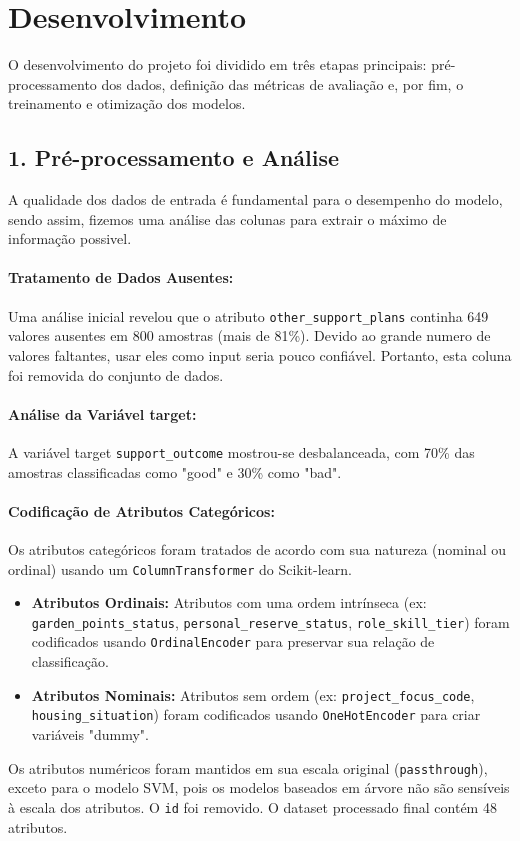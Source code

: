 \section*{Desenvolvimento}

O desenvolvimento do projeto foi dividido em três etapas principais: pré-processamento dos dados, definição das métricas de avaliação e, por fim, o treinamento e otimização dos modelos.

\subsection*{1. Pré-processamento e Análise}
A qualidade dos dados de entrada é fundamental para o desempenho do modelo, sendo assim, fizemos uma análise das colunas para extrair o máximo de informação possivel.

\paragraph{Tratamento de Dados Ausentes:} Uma análise inicial revelou que o atributo \texttt{other\_support\_plans} continha 649 valores ausentes em 800 amostras (mais de 81\%).
Devido ao grande numero de valores faltantes, usar eles como input seria pouco confiável.
Portanto, esta coluna foi removida do conjunto de dados.

\paragraph{Análise da Variável target:} A variável target \texttt{support\_outcome} mostrou-se desbalanceada, com 70\% das amostras classificadas como "good" e 30\% como "bad".

\paragraph{Codificação de Atributos Categóricos:} Os atributos categóricos foram tratados de acordo 
com sua natureza (nominal ou ordinal) usando um \texttt{ColumnTransformer} do Scikit-learn.
\begin{itemize}
    \item \textbf{Atributos Ordinais:} Atributos com uma ordem intrínseca (ex: \texttt{garden\_points\_status}, \texttt{personal\_reserve\_status}, \texttt{role\_skill\_tier}) foram codificados usando \texttt{OrdinalEncoder} para preservar sua relação de classificação.
    \item \textbf{Atributos Nominais:} Atributos sem ordem (ex: \texttt{project\_focus\_code}, \texttt{housing\_situation}) foram codificados usando \texttt{OneHotEncoder} para criar variáveis "dummy".
\end{itemize}
Os atributos numéricos foram mantidos em sua escala original (\texttt{passthrough}), exceto para o modelo SVM, pois os modelos baseados em árvore não são sensíveis à escala dos atributos. O \texttt{id} foi removido. O dataset processado final contém 48 atributos.
\vspace{5mm}
